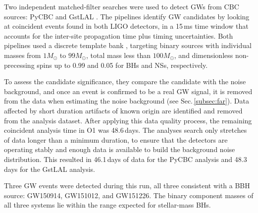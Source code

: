 \documentclass[binding=0.6cm, LaM]{sapthesis}
\begin{document}
	Two independent matched-filter searches were used to detect GWs from CBC sources: 
	{\ttfamily PyCBC} \cite{109, 110, 111, 112} and {\ttfamily GstLAL} \cite{112, 113, 114}.
	The pipelines identify GW candidates by looking at coincident events 
	found in both LIGO detectors, in a 15\,ms time window 
	that accounts for the inter-site propagation time plus timing uncertainties. 
	Both pipelines used a discrete template bank \cite{42, 114, 115, 117, 118, 119, 120}, 
	targeting binary sources with individual masses from $1{M_\odot}$ to $99{M_\odot}$,
	total mass less than $100{M_\odot}$, and dimensionless non-precessing spins up to 0.99 and 0.05 for BHs and NSs, respectively.

	To assess the candidate significance, they compare the candidate with the noise background, 
	and once an event is confirmed to be a real GW signal, 
	it is removed from the data when estimating the noise background (see Sec.\,\ref{subsec:far}).
	Data affected by short duration artifacts of known origin are identified and removed from the analysis dataset.
	After applying this data quality process, the remaining coincident analysis time in O1 was 48.6\,days. 
	The analyses search only stretches of data longer than a minimum duration, 
	to ensure that the detectors are operating stably and enough data is available to build the background noise distribution.
	This resulted in 46.1\,days of data for the {\ttfamily PyCBC} analysis and 48.3\,days for the {\ttfamily GstLAL} analysis.

	Three GW events were detected during this run, all three consistent with a BBH source: GW150914, GW151012, and GW151226.
	The binary component masses of all three systems lie 
	within the range expected for stellar-mass BHs. 
\end{document}

